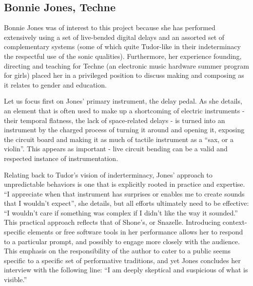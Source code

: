 
\subsection{Bonnie Jones, Techne}

Bonnie Jones was of interest to this project because she has performed extensively using a set of live-bended digital delays and an assorted set of complementary systems (some of which quite Tudor-like in their indeterminacy the respectful use of the sonic qualities). Furthermore, her experience founding, directing and teaching for Techne (an electronic music hardware summer program for girls) placed her in a privileged position to discuss making and composing as it relates to gender and education. 

Let us focus first on Jones' primary instrument, the delay pedal. As she details, an element that is often used to make up a shortcoming of electric instruments - their temporal flatness, the lack of space-related delays - is turned into an instrument by the charged process of turning it around and opening it, exposing the circuit board and making it as much of tactile instrument as a ``sax, or a violin''. This appears as important - live circuit bending can be a valid and respected instance of instrumentation. 

Relating back to Tudor's vision of inderterminacy, Jones' approach to unpredictable behaviors is one that is explicitly rooted in practice and expertise. ``I appreciate when that instrument has surprises or enables me to create sounds that I wouldn't expect'', she details, but all efforts ultimately need to be effective: ``I wouldn't care if something was complex if I didn't like the way it sounded.'' This practical approach reflects that of Shone's, or Snazelle. Introducing context-specific elements or free software tools in her performance allows her to respond to a particular prompt, and possibly to engage more closely with the audience. This emphasis on the responsibility of the author to cater to a public seems specific to a specific set of performative traditions, and yet Jones concludes her interview with the following line: ``I am deeply skeptical and suspicious of what is visible.'' 

